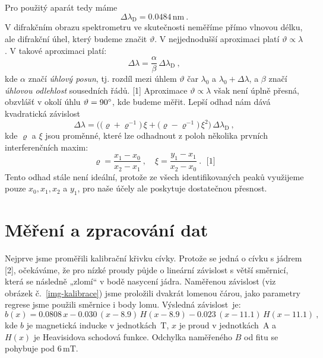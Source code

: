 \documentclass[10pt,a4paper]{article}
\renewcommand{\U}[1]{\ensuremath{\,\mathrm{#1}}}
\newcommand{\°}{\degree}
\begin{document}
Pro použitý aparát tedy máme
\begin{equation}
    \Delta\lambda_{\mathrm{D}} = 0.0484 \U{nm} \: .
    \label{eq-velikost-disp-obl}
\end{equation}
V difrakčním obrazu spektrometru ve skutečnosti neměříme přímo vlnovou délku, ale difrakční úhel, který budeme značit $\vartheta$. V nejjednodušší aproximaci platí $\vartheta \propto \lambda$. V takové aproximaci platí:
\begin{equation*}
    \Delta\lambda = \frac{\alpha}{\beta} \, \Delta\lambda_{\mathrm{D}} \: ,
\end{equation*}
kde $\alpha$ značí \textit{úhlový posun}, tj. rozdíl mezi úhlem $\vartheta$ čar $\lambda_0$ a $\lambda_0 + \Delta\lambda$, a $\beta$ značí \textit{úhlovou odlehlost} sousedních řádů. [1] Aproximace $\vartheta \propto \lambda$ však není úplně přesná, obzvlášť v okolí úhlu $\vartheta = 90\°$, kde budeme měřit. Lepší odhad nám dává kvadratická závislost
\begin{equation}
    \Delta\lambda =
    \Big( \big( \varrho + \varrho^{-1} \big) \, \xi + \big( \varrho - \varrho^{-1} \big) \, \xi^2 \Big)
    \, \Delta\lambda_{\mathrm{D}} \: ,
    \label{eq-kvadraticka}
\end{equation}
kde $\varrho$ a $\xi$ jsou proměnné, které lze odhadnout z poloh několika prvních interferenčních maxim:
\begin{equation*}
    \varrho = \frac{x_1 - x_0}{x_2 - x_1} \: , \quad
    \xi = \frac{y_1 - x_1}{x_2 - x_0} \: .
    \; \text{ [1]}
\end{equation*}
Tento odhad stále není ideální, protože ze všech identifikovaných peaků využijeme pouze $x_0, x_1, x_2$ a $y_1$, pro naše účely ale poskytuje dostatečnou přesnost.



\section{Měření a zpracování dat}
Nejprve jsme proměřili kalibrační křivku cívky. Protože se jedná o cívku s jádrem [2], očekáváme, že pro nízké proudy půjde o lineární závislost s větší směrnicí, která se následně „zlomí“ v bodě nasycení jádra. Naměřenou závislost (viz obrázek č.~\ref{img-kalibrace}) jsme proložili dvakrát lomenou čárou, jako parametry regrese jsme použili směrnice i body lomu. Výsledná závislost~je:
\begin{equation}
    b(x) = 0.0808 \, x - 0.030 \, (x-8.9) \, H(x-8.9) - 0.023 \, (x-11.1) \, H(x-11.1) \: ,
    \label{eq-magnetic-fit}
\end{equation}
kde $b$ je magnetická inducke v jednotkách $\U{T}$, $x$ je proud v jednotkách $\U{A}$ a $H(x)$ je Heavisidova schodová funkce. Odchylka naměřeného $B$ od fitu se pohybuje pod $6 \U{mT}$.
\end{document}
